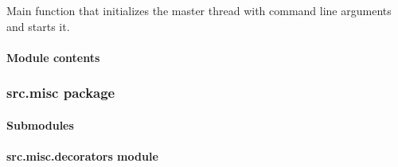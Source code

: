 \documentclass[letterpaper,10pt,english]{sphinxmanual}
\begin{document}

\begin{fulllineitems}
\label{src.mapping:src.mapping.mapthreading.main}
Main function that initializes the master thread with command line arguments and starts it.

\end{fulllineitems}



\paragraph{Module contents}
\label{src.mapping:module-src.mapping}\label{src.mapping:module-contents}

\subsubsection{src.misc package}
\label{src.misc:src-misc-package}\label{src.misc::doc}

\paragraph{Submodules}
\label{src.misc:submodules}

\paragraph{src.misc.decorators module}
\label{src.misc:module-src.misc.decorators}\label{src.misc:src-misc-decorators-module}

\begin{fulllineitems}
\label{src.misc:src.misc.decorators.alt}
\end{fulllineitems}


\begin{fulllineitems}
\label{src.misc:src.misc.decorators.log_time}
\end{fulllineitems}


\begin{fulllineitems}
\label{src.misc:src.misc.decorators.log_time_mp}
\end{fulllineitems}
\end{document}
